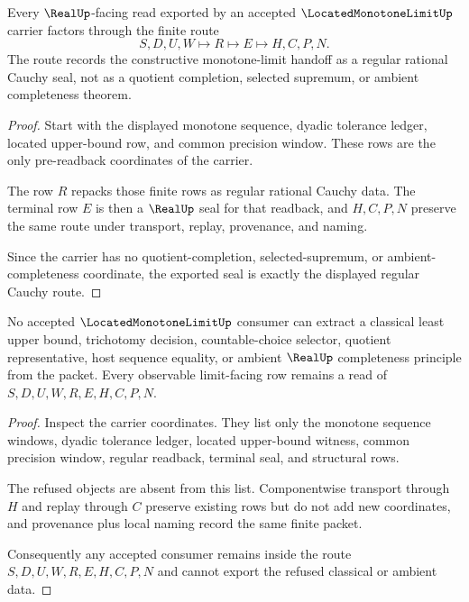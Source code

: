 \begin{theorem}
\label{thm:located-monotone-limit-regular-cauchy-seal}
Every $\RealUp$-facing read exported by an accepted $\LocatedMonotoneLimitUp$ carrier factors through the finite route
$$
S,D,U,W \longmapsto R \longmapsto E \longmapsto H,C,P,N.
$$
The route records the constructive monotone-limit handoff as a regular rational Cauchy seal, not as a quotient completion, selected supremum, or ambient completeness theorem.
\end{theorem}
\begin{proof}
Start with the displayed monotone sequence, dyadic tolerance ledger, located upper-bound row, and common precision window. These rows are the only pre-readback coordinates of the carrier.

The row $R$ repacks those finite rows as regular rational Cauchy data. The terminal row $E$ is then a $\RealUp$ seal for that readback, and $H,C,P,N$ preserve the same route under transport, replay, provenance, and naming.

Since the carrier has no quotient-completion, selected-supremum, or ambient-completeness coordinate, the exported seal is exactly the displayed regular Cauchy route.
\end{proof}

\begin{theorem}
\label{thm:located-monotone-limit-nonescape}
No accepted $\LocatedMonotoneLimitUp$ consumer can extract a classical least upper bound, trichotomy decision, countable-choice selector, quotient representative, host sequence equality, or ambient $\RealUp$ completeness principle from the packet. Every observable limit-facing row remains a read of $S,D,U,W,R,E,H,C,P,N$.
\end{theorem}
\begin{proof}
Inspect the carrier coordinates. They list only the monotone sequence windows, dyadic tolerance ledger, located upper-bound witness, common precision window, regular readback, terminal seal, and structural rows.

The refused objects are absent from this list. Componentwise transport through $H$ and replay through $C$ preserve existing rows but do not add new coordinates, and provenance plus local naming record the same finite packet.

Consequently any accepted consumer remains inside the route $S,D,U,W,R,E,H,C,P,N$ and cannot export the refused classical or ambient data.
\end{proof}


